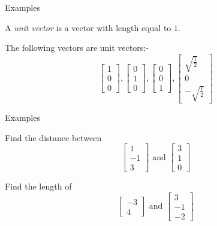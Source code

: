 \documentclass{beamer}
\begin{document}
\begin{frame}{Examples}
  \begin{definition}
    A \emph{unit vector} is a vector with length equal to $1$.
  \end{definition}
  \begin{example}
    The following vectors are unit vectors:-
    \begin{equation*}
      \left[
	\begin{array}{c}
          1\\
          0\\
          0
	\end{array}
      \right],
      \left[
	\begin{array}{c}
          0\\
          1\\
          0
	\end{array}
      \right],
      \left[
	\begin{array}{c}
          0\\
          0\\
          1
	\end{array}
      \right],
      \left[
	\begin{array}{c}
          \sqrt{\frac{1}{2}}\\
          0\\
          - \sqrt{\frac{1}{2}}
	\end{array}
      \right]
    \end{equation*}
  \end{example}
\end{frame}

\begin{frame}{Examples}
  \begin{example}
    Find the distance between
    \begin{equation*}
      \left[
	\begin{array}{c}
          1\\
          -1\\
          3
	\end{array}
      \right]\text{ and }
      \left[
	\begin{array}{c}
          3\\
          1\\
          0
	\end{array}
      \right]
    \end{equation*}
  \end{example}
  \begin{example}
    Find the length of
    \begin{equation*}
      \left[
	\begin{array}{c}
          -3\\
          4
	\end{array}
      \right]\text{ and }
      \left[
	\begin{array}{c}
          3\\
          -1\\
          -2
	\end{array}
      \right]
    \end{equation*}
  \end{example}
\end{frame}
\end{document}
